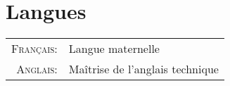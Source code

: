 \section{\texorpdfstring{\color{Blue}Langues}{Langues}}
\begin{tabular}{>{\small}r>{\small}l}
 \parbox{\datebox}{\raggedleft\textsc{Français:}}&Langue maternelle\\
\textsc{Anglais:}&Maîtrise de l'anglais technique\\
\end{tabular}